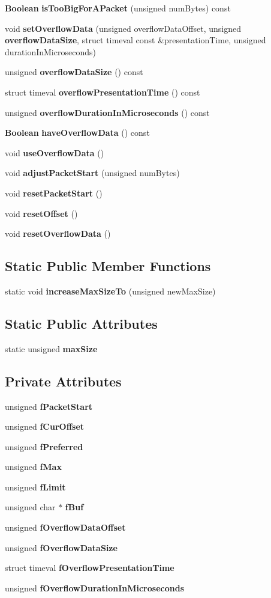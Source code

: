\begin{DoxyCompactItemize}
\item 
{\bf Boolean} {\bf is\+Too\+Big\+For\+A\+Packet} (unsigned num\+Bytes) const 
\item 
void {\bf set\+Overflow\+Data} (unsigned overflow\+Data\+Offset, unsigned {\bf overflow\+Data\+Size}, struct timeval const \&presentation\+Time, unsigned duration\+In\+Microseconds)
\item 
unsigned {\bf overflow\+Data\+Size} () const 
\item 
struct timeval {\bf overflow\+Presentation\+Time} () const 
\item 
unsigned {\bf overflow\+Duration\+In\+Microseconds} () const 
\item 
{\bf Boolean} {\bf have\+Overflow\+Data} () const 
\item 
void {\bf use\+Overflow\+Data} ()
\item 
void {\bf adjust\+Packet\+Start} (unsigned num\+Bytes)
\item 
void {\bf reset\+Packet\+Start} ()
\item 
void {\bf reset\+Offset} ()
\item 
void {\bf reset\+Overflow\+Data} ()
\end{DoxyCompactItemize}
\subsection*{Static Public Member Functions}
\begin{DoxyCompactItemize}
\item 
static void {\bf increase\+Max\+Size\+To} (unsigned new\+Max\+Size)
\end{DoxyCompactItemize}
\subsection*{Static Public Attributes}
\begin{DoxyCompactItemize}
\item 
static unsigned {\bf max\+Size}
\end{DoxyCompactItemize}
\subsection*{Private Attributes}
\begin{DoxyCompactItemize}
\item 
unsigned {\bf f\+Packet\+Start}
\item 
unsigned {\bf f\+Cur\+Offset}
\item 
unsigned {\bf f\+Preferred}
\item 
unsigned {\bf f\+Max}
\item 
unsigned {\bf f\+Limit}
\item 
unsigned char $\ast$ {\bf f\+Buf}
\item 
unsigned {\bf f\+Overflow\+Data\+Offset}
\item 
unsigned {\bf f\+Overflow\+Data\+Size}
\item 
struct timeval {\bf f\+Overflow\+Presentation\+Time}
\item 
unsigned {\bf f\+Overflow\+Duration\+In\+Microseconds}
\end{DoxyCompactItemize}


